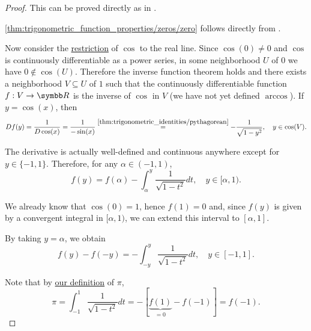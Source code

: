 \begin{proof}\mbox{}
   This can be proved directly as in .

   \ref{thm:trigonometric_function_properties/zeros/zero} follows directly from .

  Now consider the \hyperref[def:function/expansion]{restriction} of \( \cos \) to the real line. Since \( \cos(0) \neq 0 \) and \( \cos \) is continuously differentiable as a power series, in some neighborhood \( U \) of \( 0 \) we have \( 0 \not\in \cos(U) \). Therefore the inverse function theorem holds and there exists a neighborhood \( V \subseteq U \) of \( 1 \) such that the continuously differentiable function \( f: V \to \BR \) is the inverse of \( \cos \) in \( V \) (we have not yet defined \hyperref[def:inverse_trigonometric_functions/arccos]{\( \arccos \)}). If \( y = \cos(x) \), then
  \begin{equation*}
    Df(y)
    =
    \frac 1 {D\cos(x)}
    =
    \frac 1 {-\sin(x)}
    \overset {\ref{thm:trigonometric_identities/pythagorean}} =
    -\frac 1 {\sqrt{1 - y^2}},
    \quad y \in \cos(V).
  \end{equation*}

  The derivative is actually well-defined and continuous anywhere except for \( y \in \{ -1, 1 \} \). Therefore, for any \( \alpha \in (-1, 1) \),
  \begin{equation*}
    f(y) = f(\alpha) - \int_{\alpha}^y \frac 1 {\sqrt{1 - t^2}} dt, \quad y \in [\alpha, 1).
  \end{equation*}

  We already know that \( \cos(0) = 1 \), hence \( f(1) = 0 \) and, since \( f(y) \) is given by a convergent integral in \( [\alpha, 1) \), we can extend this interval to \( [\alpha, 1] \).

  By taking \( y = \alpha \), we obtain
  \begin{equation*}
    f(y) - f(-y) = -\int_{-y}^y \frac 1 {\sqrt{1 - t^2}} dt, \quad y \in [-1, 1].
  \end{equation*}

  Note that by \hyperref[def:pi]{our definition} of \( \pi \),
  \begin{equation*}
    \pi
    =
    \int_{-1}^1 \frac 1 {\sqrt{1 - t^2}} dt
    =
    -[\underbrace{f(1)}_{=0} - f(-1)]
    =
    f(-1).
  \end{equation*}


\end{proof}
